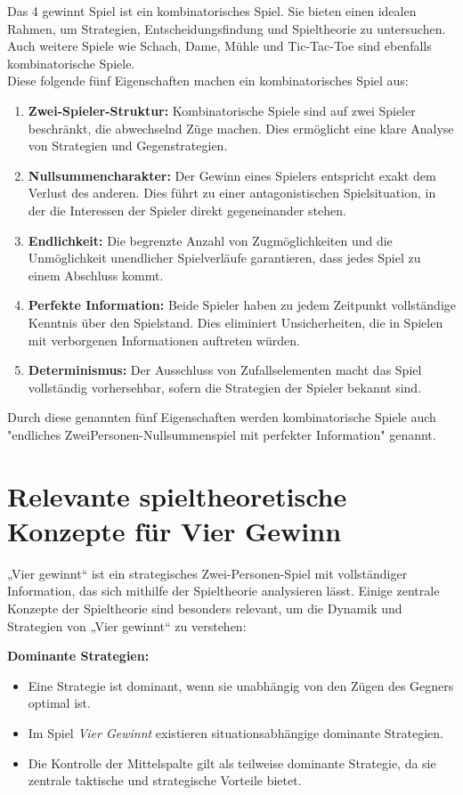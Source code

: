 Das 4 gewinnt Spiel ist ein kombinatorisches Spiel. Sie bieten einen idealen Rahmen, um Strategien, Entscheidungsfindung und Spieltheorie zu untersuchen. Auch weitere Spiele wie Schach, Dame, Mühle und Tic-Tac-Toe sind ebenfalls kombinatorische Spiele. \\
Diese folgende fünf Eigenschaften machen ein kombinatorisches Spiel aus:
\begin{enumerate}
	\item   \textbf{Zwei-Spieler-Struktur: }Kombinatorische Spiele sind auf zwei Spieler beschränkt, die abwechselnd Züge machen. Dies ermöglicht eine klare Analyse von Strategien und Gegenstrategien.
	\item 	\textbf{Nullsummencharakter: }Der Gewinn eines Spielers entspricht exakt dem Verlust des anderen. Dies führt zu einer antagonistischen Spielsituation, in der die Interessen der Spieler direkt gegeneinander stehen.
	\item 	\textbf{Endlichkeit: }Die begrenzte Anzahl von Zugmöglichkeiten und die Unmöglichkeit unendlicher Spielverläufe garantieren, dass jedes Spiel zu einem Abschluss kommt.
	\item 	\textbf{Perfekte Information: }Beide Spieler haben zu jedem Zeitpunkt vollständige Kenntnis über den Spielstand. Dies eliminiert Unsicherheiten, die in Spielen mit verborgenen Informationen auftreten würden.
	\item 	\textbf{Determinismus:} Der Ausschluss von Zufallselementen macht das Spiel vollständig vorhersehbar, sofern die Strategien der Spieler bekannt sind.
\end{enumerate}

Durch diese genannten fünf Eigenschaften werden kombinatorische Spiele auch "endliches ZweiPersonen-Nullsummenspiel mit perfekter Information" genannt.

\section{Relevante spieltheoretische Konzepte für Vier Gewinn}
„Vier gewinnt“ ist ein strategisches Zwei-Personen-Spiel mit vollständiger Information, das sich mithilfe der Spieltheorie analysieren lässt. Einige zentrale Konzepte der Spieltheorie sind besonders relevant, um die Dynamik und Strategien von „Vier gewinnt“ zu verstehen:


\textbf{Dominante Strategien:}
\begin{itemize}
	\item Eine Strategie ist dominant, wenn sie unabhängig von den Zügen des Gegners optimal ist.
	\item Im Spiel \textit{Vier Gewinnt} existieren situationsabhängige dominante Strategien.
	\item Die Kontrolle der Mittelspalte gilt als teilweise dominante Strategie, da sie zentrale taktische und strategische Vorteile bietet.
\end{itemize}


